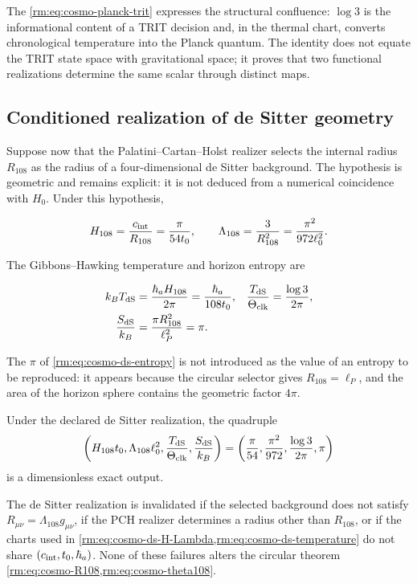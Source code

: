 The \cref{rm:eq:cosmo-planck-trit} expresses the structural confluence:
\(\log3\) is the informational content of a TRIT decision and, in the
thermal chart, converts chronological temperature into the Planck
quantum. The identity does not equate the TRIT state space with gravitational space;
it proves that two functional realizations determine the same scalar through distinct
maps.

\subsection{Conditioned realization of de Sitter geometry}

Suppose now that the Palatini--Cartan--Holst realizer selects the internal
radius \(R_{108}\) as the radius of a four-dimensional de Sitter background. The
hypothesis is geometric and remains explicit: it is not deduced from a numerical
coincidence with \(H_0\). Under this hypothesis,

\begin{equation}
H_{108}=\frac{c_{\rm int}}{R_{108}}
=\frac{\pi}{54t_0},
\qquad
\Lambda_{108}=\frac{3}{R_{108}^2}
=\frac{\pi^2}{972\ell_0^2}.
\label{rm:eq:cosmo-ds-H-Lambda}
\end{equation}

The Gibbons--Hawking temperature and horizon entropy are

\begin{align}
k_BT_{\rm dS}
&=\frac{\hbar_a H_{108}}{2\pi}
=\frac{\hbar_a}{108t_0},
&
\frac{T_{\rm dS}}{\Theta_{\rm clk}}
&=\frac{\log3}{2\pi},
\label{rm:eq:cosmo-ds-temperature}\\
\frac{S_{\rm dS}}{k_B}
&=\frac{\pi R_{108}^2}{\ell_P^2}=\pi.
\label{rm:eq:cosmo-ds-entropy}
\end{align}

The \(\pi\) of \cref{rm:eq:cosmo-ds-entropy} is not introduced as the value of an
entropy to be reproduced: it appears because the circular selector gives
\(R_{108}=\ell_P\), and the area of the horizon sphere contains the
geometric factor \(4\pi\).

\begin{proposition}
Under the declared de Sitter realization, the quadruple
\[
\left(
H_{108}t_0,
\Lambda_{108}\ell_0^2,
\frac{T_{\rm dS}}{\Theta_{\rm clk}},
\frac{S_{\rm dS}}{k_B}
\right)
=\left(
\frac\pi{54},
\frac{\pi^2}{972},
\frac{\log3}{2\pi},
\pi
\right)
\]
is a dimensionless exact output.
\end{proposition}

\begin{falsifier}
The de Sitter realization is invalidated if the selected background does not
satisfy \(R_{\mu\nu}=\Lambda_{108}g_{\mu\nu}\), if the PCH realizer determines
a radius other than \(R_{108}\), or if the charts used in
\cref{rm:eq:cosmo-ds-H-Lambda,rm:eq:cosmo-ds-temperature} do not share
\((c_{\rm int},t_0,\hbar_a)\). None of these failures alters the
circular theorem \cref{rm:eq:cosmo-R108,rm:eq:cosmo-theta108}.
\end{falsifier}
